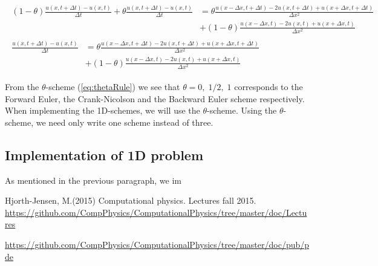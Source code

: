 \documentclass{article}
\begin{document}
\begin{subequations}
	\begin{align}
		\begin{split}
			(1-\theta) 	\frac{u(x,t+\Delta t) - u(x,t)}{\Delta t} + \theta 	\frac{u(x,t+\Delta t) - u(x,t)}{\Delta t}&=  \theta \frac{u(x-\Delta x,t+ \Delta t)
				- 2u(x,t+\Delta t) +u(x+\Delta x,t+\Delta t)}{\Delta x^2} \\
			&+ (1 - \theta) \frac{u(x-\Delta x,t) - 2u(x,t) +u(x+ \Delta x,t)}{\Delta x^2} 
		\end{split}\\
		\begin{split}
			\frac{u(x,t+\Delta t) - u(x,t)}{\Delta t}&= 
			  \theta \frac{u(x-\Delta x,t+ \Delta t)
				- 2u(x,t+\Delta t) +u(x+\Delta x,t+\Delta t)}{\Delta x^2} \\
			&+ (1 - \theta) \frac{u(x-\Delta x,t) - 2u(x,t) +u(x+ \Delta x,t)}{\Delta x^2} 
			\end{split}\label{eq:thetaRule}
	\end{align}
\end{subequations}

From the $\theta$-scheme (\ref{eq:thetaRule}) we see that $\theta = 0,\;1/2,\;1$ corresponds to the Forward Euler, the Crank-Nicolson and the Backward Euler scheme respectively.\\

When implementing the 1D-schemes, we will use the $\theta$-scheme. Using the $\theta$-scheme, we need only write one scheme instead of three.

\subsection{Implementation of 1D problem}
As mentioned in the previous paragraph, we im


\begin{thebibliography}{9}
	Hjorth-Jensen, M.(2015)
	Computational physics. Lectures fall 2015. 
	\url{https://github.com/CompPhysics/ComputationalPhysics/tree/master/doc/Lectures}
	
	\url{https://github.com/CompPhysics/ComputationalPhysics/tree/master/doc/pub/pde}

\end{thebibliography}
\end{document}
